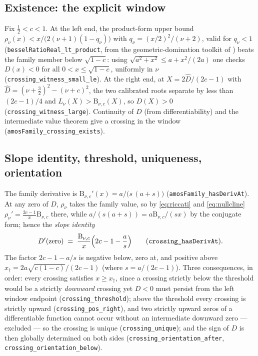 \documentclass[11pt]{article}
\newcommand{\lean}[1]{\texttt{#1}}
\newcommand{\Bfam}{\mathrm{B}}
\begin{document}
\subsection{Existence: the explicit window}\label{sec:window}

Fix $\tfrac12 < c < 1$.  At the left end, the product-form upper
bound $\rho_\nu(x) < x/\bigl(2(\nu+1)(1-q_\nu)\bigr)$ with
$q_\nu = (x/2)^2/(\nu+2)$, valid for $q_\nu < 1$
(\lean{besselRatioReal\_lt\_product},
from the geometric-domination toolkit of \cite{ErikssonC4}) beats
the family member below $\sqrt{1-c}$: using
$\sqrt{a^2+x^2} \le a + x^2/(2a)$ one checks
$D(x) < 0$ for all $0 < x \le \sqrt{1-c}$, uniformly in $\nu$
(\lean{crossing\_witness\_small\_le}).  At the right end, at
$X = 2\hat{D}/(2c-1)$ with $\hat{D} = (\nu+\tfrac32)^2-(\nu+c)^2$,
the two calibrated roots separate by less than $(2c-1)/4$ and
$L_\nu(X) > \Bfam_{\nu,c}(X)$, so $D(X) > 0$
(\lean{crossing\_witness\_large}).  Continuity of $D$ (from
differentiability) and the intermediate value theorem give a
crossing in the window (\lean{amosFamily\_crossing\_exists}).

\subsection{Slope identity, threshold, uniqueness,
orientation}\label{sec:slope}

The family derivative is
$\Bfam_{\nu,c}'(x) = a/\bigl(s\,(a+s)\bigr)$
(\lean{amosFamily\_hasDerivAt}).  At any zero of $D$, $\rho_\nu$
takes the family value, so by \eqref{eq:riccati} and
\eqref{eq:nullcline} $\rho_\nu' = \tfrac{2c-1}{x}\Bfam_{\nu,c}$
there, while $a/(s(a+s)) = a\Bfam_{\nu,c}/(sx)$ by the conjugate
form; hence the \emph{slope identity}
\begin{equation}\label{eq:slope}
D'(\text{zero}) \;=\;
\frac{\Bfam_{\nu,c}}{x}\Bigl(2c-1-\frac{a}{s}\Bigr)
\qquad (\lean{crossing\_hasDerivAt}).
\end{equation}
The factor $2c-1-a/s$ is negative below, zero at, and positive
above $x_\dagger = 2a\sqrt{c(1-c)}/(2c-1)$ (where
$s = a/(2c-1)$).  Three consequences, in order: every crossing
satisfies $x \ge x_\dagger$, since a crossing strictly below the
threshold would be a strictly \emph{downward} crossing yet $D < 0$
must persist from the left window endpoint
(\lean{crossing\_threshold}); above the threshold every crossing is
strictly upward (\lean{crossing\_pos\_right}), and two strictly
upward zeros of a differentiable function cannot occur without an
intermediate downward zero --- excluded --- so the crossing is
unique (\lean{crossing\_unique}); and the sign of $D$ is then
globally determined on both sides
(\lean{crossing\_orientation\_after},
\lean{crossing\_orientation\_below}).
\end{document}
